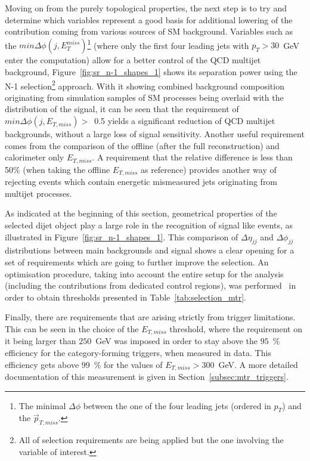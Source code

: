 \hspace{10pt} Moving on from the purely topological properties, the next step is to try and determine which variables represent a good basis for additional lowering of the contribution coming from various sources of SM background. Variables such as the $min \Delta \phi (j, E_T^{miss})$\footnote{The minimal $\Delta\phi$ between the one of the four leading jets (ordered in $p_T$) and the $\vec{p}_{T, miss}$.} (where only the first four leading jets with $p_T > 30$~GeV enter the computation) allow for a better control of the QCD multijet background, Figure~\ref{fig:sr_n-1_shapes_1} shows its separation power using the N-1 selection\footnote{All of selection requirements are being applied but the one involving the variable of interest.} approach. With it showing combined background composition originating from simulation samples of SM processes being overlaid with the distribution of the signal, it can be seen that the requirement of $min \Delta \phi (j, E_{T,miss})>$~0.5 yields a significant reduction of QCD multijet backgrounds, without a large loss of signal sensitivity. Another useful requirement comes from the comparison of the offline (after the full reconstruction) and calorimeter only $E_{T,miss}$. A requirement that the relative difference is less than 50\% (when taking the offline $E_{T,miss}$ as reference) provides another way of rejecting events which contain energetic mismeasured jets originating from multijet processes. 

\hspace{10pt} As indicated at the beginning of this section, geometrical properties of the selected dijet object play a large role in the recognition of signal like events, as illustrated in Figure~\ref{fig:sr_n-1_shapes_1}. This comparison of $\Delta \eta_{jj}$ and $\Delta \phi_{jj}$ distributions between main backgrounds and signal shows a clear opening for a set of requirements which are going to further improve the selection. An optimisation procedure, taking into account the entire setup for the analysis (including the contributions from dedicated control regions), was performed~\cite{paper:HIG_17_023} in order to obtain thresholds presented in Table~\ref{tab:selection_mtr}. 

\hspace{10pt} Finally, there are requirements that are arising strictly from trigger limitations. This can be seen in the choice of the $E_{T,miss}$ threshold, where the requirement on it being larger than $250$~GeV was imposed in order to stay above the $95$~\% efficiency for the category-forming triggers, when measured in data. This efficiency gets above $99$~\% for the values of $E_{T,miss}>300$~GeV. A more detailed documentation of this measurement is given in Section~\ref{subsec:mtr_triggers}.

